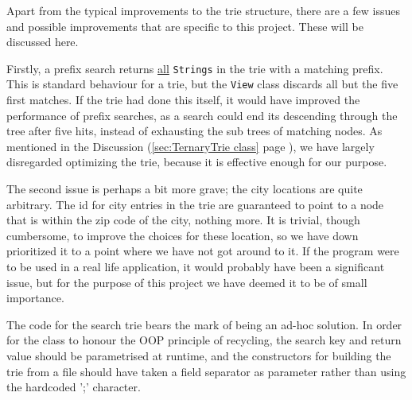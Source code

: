 Apart from the typical improvements to the trie structure, there are a few issues and possible improvements that are specific to this project. These will be discussed here.

Firstly, a prefix search returns \underline{all} \texttt{Strings} in the trie with a matching prefix.
This is standard behaviour for a trie, but the \texttt{View} class discards all but the five first matches. If the trie had done this itself, it would have improved the performance of prefix searches, as a search could end its descending through the tree after five hits, instead of exhausting the sub trees of matching nodes. As mentioned in the Discussion (\ref{sec:TernaryTrie class} page \pageref{sec:TernaryTrie class}),
we have largely disregarded optimizing the trie, because it is effective enough for our purpose.

The second issue is perhaps a bit more grave; the city locations are quite arbitrary.
The id for city entries in the trie are guaranteed to point to a node that is within the zip code of the city, nothing more. It is trivial, though cumbersome, to improve the choices for these location, so we have down prioritized it to a point where we have not got around to it.
If the program were to be used in a real life application, it would probably have been a significant issue, but for the purpose of this project we have deemed it to be of small importance.

The code for the search trie bears the mark of being an ad-hoc solution. In order for the class to honour the OOP principle of recycling, the search key and return value should be parametrised at runtime, and the constructors for building the trie from a file should have taken a field separator as parameter rather than using the hardcoded ';' character.

